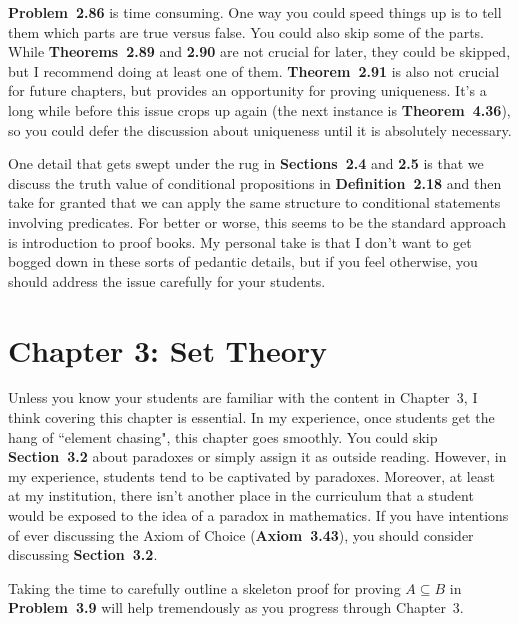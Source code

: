 \documentclass[11pt]{article}%
\newcommand{\blankline}{\pagebreak[2]\vspace{.5\baselineskip}}
\begin{document}
\blankline

\textbf{Problem~2.86} is time consuming.  One way you could speed things up is to tell them which parts are true versus false.  You could also skip some of the parts.  While \textbf{Theorems~2.89} and \textbf{2.90} are not crucial for later, they could be skipped, but I recommend doing at least one of them.  \textbf{Theorem~2.91} is also not crucial for future chapters, but provides an opportunity for proving uniqueness.  It's a long while before this issue crops up again (the next instance is \textbf{Theorem~4.36}), so you could defer the discussion about uniqueness until it is absolutely necessary. 

\blankline

One detail that gets swept under the rug in \textbf{Sections~2.4} and \textbf{2.5} is that we discuss the truth value of conditional propositions in \textbf{Definition~2.18} and then take for granted that we can apply the same structure to conditional statements involving predicates. For better or worse, this seems to be the standard approach is introduction to proof books.  My personal take is that I don't want to get bogged down in these sorts of pedantic details, but if you feel otherwise, you should address the issue carefully for your students.


\section*{Chapter 3: Set Theory}

Unless you know your students are familiar with the content in Chapter~3, I think covering this chapter is essential.  In my experience, once students get the hang of ``element chasing", this chapter goes smoothly.  You could skip \textbf{Section~3.2} about paradoxes or simply assign it as outside reading.  However, in my experience, students tend to be captivated by paradoxes.  Moreover, at least at my institution, there isn't another place in the curriculum that a student would be exposed to the idea of a paradox in mathematics.  If you have intentions of ever discussing the Axiom of Choice (\textbf{Axiom~3.43}), you should consider discussing \textbf{Section~3.2}.

\blankline

Taking the time to carefully outline a skeleton proof for proving $A\subseteq B$ in \textbf{Problem~3.9} will help tremendously as you progress through Chapter~3. 

\blankline
\end{document}
